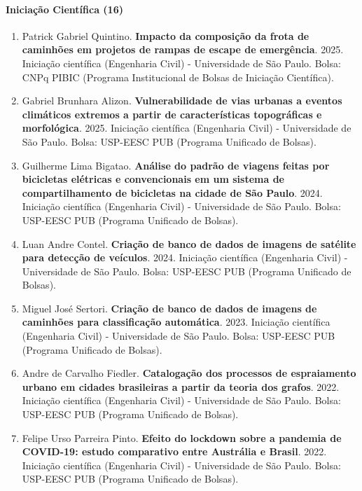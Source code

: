 \documentclass[
  brazilian,
  11pt,
  a4paper,
]{article}
\begin{document}
\paragraph{Iniciação Científica
(16)}\label{iniciauxe7uxe3o-cientuxedfica-16}

\begin{enumerate}
\def\labelenumi{\arabic{enumi}.}
\item
  Patrick Gabriel Quintino. \textbf{Impacto da composição da frota de
  caminhões em projetos de rampas de escape de emergência}. 2025.
  Iniciação científica (Engenharia Civil) - Universidade de São Paulo.
  Bolsa: CNPq PIBIC (Programa Institucional de Bolsas de Iniciação
  Científica).
\item
  Gabriel Brunhara Alizon. \textbf{Vulnerabilidade de vias urbanas a
  eventos climáticos extremos a partir de características topográficas e
  morfológica}. 2025. Iniciação científica (Engenharia Civil) -
  Universidade de São Paulo. Bolsa: USP-EESC PUB (Programa Unificado de
  Bolsas).
\item
  Guilherme Lima Bigatao. \textbf{Análise do padrão de viagens feitas
  por bicicletas elétricas e convencionais em um sistema de
  compartilhamento de bicicletas na cidade de São Paulo}. 2024.
  Iniciação científica (Engenharia Civil) - Universidade de São Paulo.
  Bolsa: USP-EESC PUB (Programa Unificado de Bolsas).
\item
  Luan Andre Contel. \textbf{Criação de banco de dados de imagens de
  satélite para detecção de veículos}. 2024. Iniciação científica
  (Engenharia Civil) - Universidade de São Paulo. Bolsa: USP-EESC PUB
  (Programa Unificado de Bolsas).
\item
  Miguel José Sertori. \textbf{Criação de banco de dados de imagens de
  caminhões para classificação automática}. 2023. Iniciação científica
  (Engenharia Civil) - Universidade de São Paulo. Bolsa: USP-EESC PUB
  (Programa Unificado de Bolsas).
\item
  Andre de Carvalho Fiedler. \textbf{Catalogação dos processos de
  espraiamento urbano em cidades brasileiras a partir da teoria dos
  grafos}. 2022. Iniciação científica (Engenharia Civil) - Universidade
  de São Paulo. Bolsa: USP-EESC PUB (Programa Unificado de Bolsas).
\item
  Felipe Urso Parreira Pinto. \textbf{Efeito do lockdown sobre a
  pandemia de COVID-19: estudo comparativo entre Austrália e Brasil}.
  2022. Iniciação científica (Engenharia Civil) - Universidade de São
  Paulo. Bolsa: USP-EESC PUB (Programa Unificado de Bolsas).

\end{enumerate}
\end{document}
